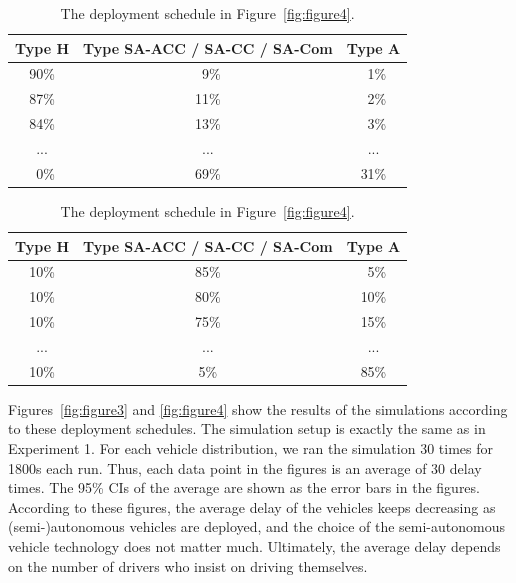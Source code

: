 \begin{table}[t]

\caption{The deployment schedule in Figure~\ref{fig:figure3}.}
\label{table:3}
\centering
\small
\begin{tabular}{|c|c|c|}
    \hline
    Type H&  Type SA-ACC / SA-CC / SA-Com &    Type A\\
    \hline
    90\% &      \ 9\% &   \ 1\% \\
    \hline
    87\% &     11\% &    \ 2\% \\
    \hline
    84\% &     13\% &    \ 3\% \\
    \hline
     ...&   ...&   ...\\
    \hline
    \ 0\%&     69\% &  31\% \\
    \hline
\end{tabular}

\vspace{+.4in}

\caption{The deployment schedule in Figure~\ref{fig:figure4}.}
\label{table:4}
\centering
\small
\begin{tabular}{|c|c|c|}
    \hline
     Type H&  Type SA-ACC / SA-CC / SA-Com &    Type A\\
    \hline
     10\%&     85\%&   \ 5\% \\
    \hline
     10\%&     80\%&  10\% \\
    \hline
     10\%&     75\%&  15\% \\
    \hline
      ...&  ... &  ...\\
    \hline
     10\%&       5\%&  85\% \\
    \hline
\end{tabular}
\end{table}

Figures~\ref{fig:figure3} and \ref{fig:figure4} show the results of
the simulations according to these deployment schedules.  The
simulation setup is exactly the same as in Experiment 1.
For each vehicle distribution, we ran the simulation 30 times for 1800s each run.  Thus, each data point in the figures is
an average of 30 delay times.  The 95\% CIs of the average are shown
as the error bars in the figures.  According to these figures, the
average delay of the vehicles keeps decreasing as
(semi-)autonomous vehicles are deployed, and the choice of the
semi-autonomous vehicle technology does not matter much.  Ultimately, the
average delay depends on the number of drivers who insist on driving
themselves.

